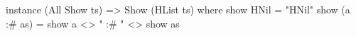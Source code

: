 \begin{code}
instance (All Show ts) => Show (HList ts) where
  show HNil = "HNil"
  show (a :# as) = show a <> " :# " <> show as
\end{code}

